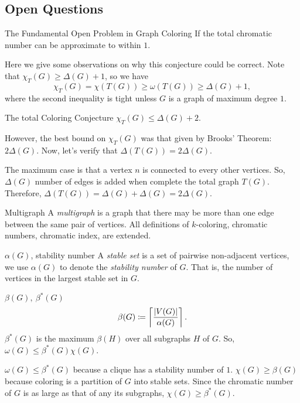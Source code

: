 \subsection{Open Questions}
\begin{conj}{The Fundamental Open Problem in Graph Coloring}
	If the total chromatic number can be approximate to within $1$. 	
\end{conj}
\begin{rmk}
	Here we give some observations on why this conjecture could be correct. Note that $\chi_T(G)\geq\Delta(G)+1$, so we have \[\chi_T(G)=\chi(T(G))\geq\omega(T(G))\geq\Delta(G)+1,\] where the second inequality is tight unless $G$ is a graph of maximum degree $1$.
\end{rmk}
\begin{conj}{The total Coloring Conjecture}
		$\chi_T(G)\leq\Delta(G)+2$. 
\end{conj}
\begin{rmk}
	However, the best bound on $\chi_T(G)$ was that given by Brooks' Theorem: $2\Delta(G)$. Now, let's verify that $\Delta(T(G))=2\Delta(G)$.
	\begin{prf}
		The maximum case is that a vertex $n$ is connected to every other vertices. So, $\Delta(G)$ number of edges is added when complete the total graph $T(G)$. Therefore, $\Delta(T(G))=\Delta(G)+\Delta(G)=2\Delta(G)$.
	\end{prf}
\end{rmk}
\begin{df}{Multigraph}
	A \textit{multigraph} is a graph that there may be more than one edge between the same pair of vertices. All definitions of $k$-coloring, chromatic numbers, chromatic index, are extended. 	
\end{df}
\begin{df}{$\alpha(G)$, stability number}
	A \textit{stable set} is a set of pairwise non-adjacent vertices, we use $\alpha(G)$ to denote the \textit{stability number} of $G$. That is, the number of vertices in the largest stable set in $G$.	
\end{df}
\begin{df}{$\beta(G),\ \beta^*(G)$}
	\[\beta(G)\coloneqq\left\lceil \dfrac{\qty|V(G)|}{\alpha(G)} \right\rceil.\] $\beta^*(G)$ is the maximum $\beta(H)$ over all subgraphs $H$ of $G$. So, $\omega(G)\leq\beta^*(G)\chi(G)$.
\end{df}
\begin{prf}
	$\omega(G)\leq\beta^*(G)$ because a clique has a stability number of $1$. $\chi(G)\geq\beta(G)$ because coloring is a partition of $G$ into stable sets. Since the chromatic number of $G$ is as large as that of any its subgraphs, $\chi(G)\geq\beta^*(G)$.	
\end{prf}
